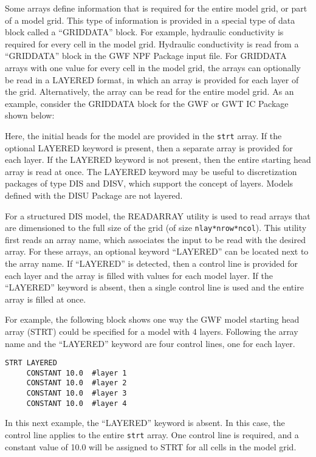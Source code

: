 Some arrays define information that is required for the entire model grid, or part of a model grid.  This type of information is provided in a special type of data block called a ``GRIDDATA'' block.  For example, hydraulic conductivity is required for every cell in the model grid.  Hydraulic conductivity is read from a ``GRIDDATA'' block in the \mf GWF NPF Package input file.  For GRIDDATA arrays with one value for every cell in the model grid, the arrays can optionally be read in a LAYERED format, in which an array is provided for each layer of the grid.  Alternatively, the array can be read for the entire model grid.  As an example, consider the GRIDDATA block for the \mf GWF or GWT IC Package shown below:



Here, the initial heads for the model are provided in the \texttt{strt} array.  If the optional LAYERED keyword is present, then a separate array is provided for each layer.  If the LAYERED keyword is not present, then the entire starting head array is read at once.  The LAYERED keyword may be useful to discretization packages of type DIS and DISV, which support the concept of layers.  Models defined with the DISU Package are not layered.

For a structured DIS model, the READARRAY utility is used to read arrays that are dimensioned to the full size of the grid (of size \texttt{nlay*nrow*ncol}). This utility first reads an array name, which associates the input to be read with the desired array.  For these arrays, an optional keyword ``LAYERED'' can be located next to the array name.  If ``LAYERED'' is detected, then a control line is provided for each layer and the array is filled with values for each model layer.  If the ``LAYERED'' keyword is absent, then a single control line is used and the entire array is filled at once.

For example, the following block shows one way the \mf GWF model starting head array (STRT) could be specified for a model with 4 layers.  Following the array name and the ``LAYERED'' keyword are four control lines, one for each layer.

\begin{lstlisting}[style=inputfile]
  STRT LAYERED
     CONSTANT 10.0  #layer 1
     CONSTANT 10.0  #layer 2
     CONSTANT 10.0  #layer 3
     CONSTANT 10.0  #layer 4
\end{lstlisting}

In this next example, the ``LAYERED'' keyword is absent.  In this case, the control line applies to the entire \texttt{strt} array.  One control line is required, and a constant value of 10.0 will be assigned to STRT for all cells in the model grid.

